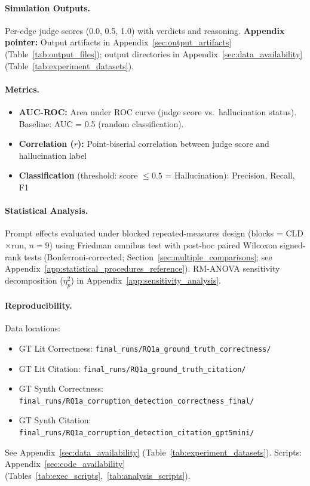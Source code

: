 \paragraph{Simulation Outputs.}
Per-edge judge scores (0.0, 0.5, 1.0) with verdicts and reasoning.
\textbf{Appendix pointer:} Output artifacts in Appendix~\ref{sec:output_artifacts} (Table~\ref{tab:output_files}); output directories in Appendix~\ref{sec:data_availability} (Table~\ref{tab:experiment_datasets}).

\paragraph{Metrics.}
\begin{itemize}[noitemsep]
    \item \textbf{AUC-ROC:} Area under ROC curve (judge score vs.\ hallucination status). Baseline: AUC = 0.5 (random classification).
    \item \textbf{Correlation ($r$):} Point-biserial correlation between judge score and hallucination label
    \item \textbf{Classification} (threshold: score $\leq 0.5$ = Hallucination): Precision, Recall, F1
\end{itemize}

\paragraph{Statistical Analysis.}
Prompt effects evaluated under blocked repeated-measures design (blocks = CLD$\times$run, $n=9$) using Friedman omnibus test with post-hoc paired Wilcoxon signed-rank tests (Bonferroni-corrected; Section~\ref{sec:multiple_comparisons}; see Appendix~\ref{app:statistical_procedures_reference}). RM-ANOVA sensitivity decomposition ($\eta^2_p$) in Appendix~\ref{app:sensitivity_analysis}.

\paragraph{Reproducibility.}
Data locations:
\begin{itemize}[noitemsep]
    \item GT Lit Correctness: \texttt{final\_runs/RQ1a\_ground\_truth\_correctness/}
    \item GT Lit Citation: \texttt{final\_runs/RQ1a\_ground\_truth\_citation/}
    \item GT Synth Correctness: \texttt{final\_runs/RQ1a\_corruption\_detection\_correctness\_final/}
    \item GT Synth Citation: \texttt{final\_runs/RQ1a\_corruption\_detection\_citation\_gpt5mini/}
\end{itemize}
See Appendix~\ref{sec:data_availability} (Table~\ref{tab:experiment_datasets}). Scripts: Appendix~\ref{sec:code_availability} (Tables~\ref{tab:exec_scripts},~\ref{tab:analysis_scripts}).

